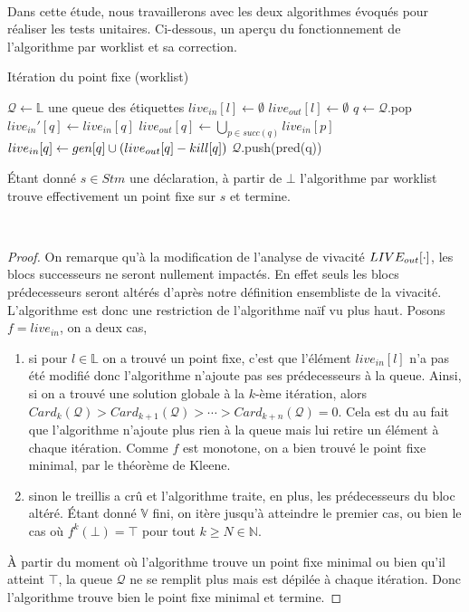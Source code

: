 \documentclass[a4paper, 11pt]{article}
\begin{document}
\\
Dans cette étude, nous travaillerons avec les deux algorithmes évoqués pour réaliser les tests unitaires. Ci-dessous, un aperçu du fonctionnement
de l'algorithme par worklist et sa correction.

\begin{algorithm}[H]
	\caption{Itération du point fixe (worklist)}
	\begin{algorithmic}
		\State $\mathcal{Q} \leftarrow \mathbb{L}$ une queue des étiquettes
		\State $live_{in}[l] \leftarrow \emptyset$
		\State $live_{out}[l] \leftarrow \emptyset$
		\EndFor
		\State $q \leftarrow \mathcal{Q}$.pop
		\State $live_{in}'[q] \leftarrow live_{in}[q]$
		\State $live_{out}[q] \leftarrow \bigcup\limits_{p\in succ(q)} live_{in}[p]$
		\State $live_{in}[q] \leftarrow gen[q] \cup (live_{out}[q] - kill[q])$
		\State $\mathcal{Q}$.push(pred(q))
		\EndIf
		\EndWhile
	\end{algorithmic}
\end{algorithm}
\noindent
\begin{lemma}
	Étant donné $s \in Stm$ une déclaration, à partir de $\bot$ l'algorithme par worklist trouve effectivement
	un point fixe sur $s$ et termine.
\end{lemma}
\\
\begin{proof}
On remarque qu'à la modification de l'analyse de vivacité $LIVE_{out}[\cdot]$,
les blocs successeurs ne seront nullement impactés. En effet seuls les blocs prédecesseurs seront
altérés d'après notre définition ensembliste de la vivacité. L'algorithme est donc une restriction de l'algorithme naïf vu plus
haut. Posons $f = live_{in}$, on a deux cas,
\begin{enumerate}
	\item si pour $l \in \mathbb{L}$ on a trouvé un point fixe, c'est que l'élément $live_{in}[l]$ n'a pas été modifié donc
	l'algorithme n'ajoute pas ses prédecesseurs à la queue. Ainsi, si on a trouvé une solution globale à la $k$-ème itération, 
	alors $Card_k(\mathcal{Q}) > Card_{k+1}(\mathcal{Q}) > \cdots > Card_{k + n}(\mathcal{Q}) = 0$. Cela est du au fait que
	l'algorithme n'ajoute plus rien à la queue mais lui retire un élément à chaque itération. Comme $f$ est monotone, on
	a bien trouvé le point fixe minimal, par le théorème de Kleene.
	\item sinon le treillis a crû et l'algorithme traite, en plus, les prédecesseurs du bloc altéré. Étant donné $\mathbb{V}$ fini,
	on itère jusqu'à atteindre le premier cas, ou bien le cas où $f^k(\bot) = \top$ pour tout $k \ge N \in \mathbb{N}$.
\end{enumerate}
À partir du moment où l'algorithme trouve un point fixe minimal ou bien qu'il atteint $\top$, la queue $\mathcal{Q}$ ne se remplit
plus mais est dépilée à chaque itération. Donc l'algorithme trouve bien le point fixe minimal et termine.
\end{proof}
\end{document}
